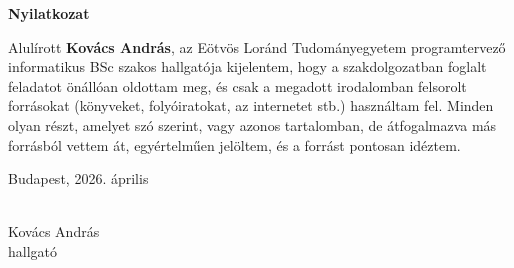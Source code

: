 \documentclass[a4paper,12pt]{article}
\begin{document}
\begin{center}
  {\Large\bfseries Nyilatkozat}
\end{center}

\vspace{1.5cm}

\noindent
Alulírott \textbf{Kovács András}, az Eötvös Loránd Tudományegyetem programtervező
informatikus BSc szakos hallgatója kijelentem, hogy a szakdolgozatban foglalt
feladatot önállóan oldottam meg, és csak a megadott irodalomban felsorolt forrásokat
(könyveket, folyóiratokat, az internetet stb.) használtam fel. Minden olyan részt,
amelyet szó szerint, vagy azonos tartalomban, de átfogalmazva más forrásból vettem
át, egyértelműen jelöltem, és a forrást pontosan idéztem.

\vspace{3cm}
\noindent
Budapest, 2026. április

\vspace{2cm}
\noindent
\makebox[7cm]{\dotfill}\\[4pt]
Kovács András\\
hallgató
\end{document}
